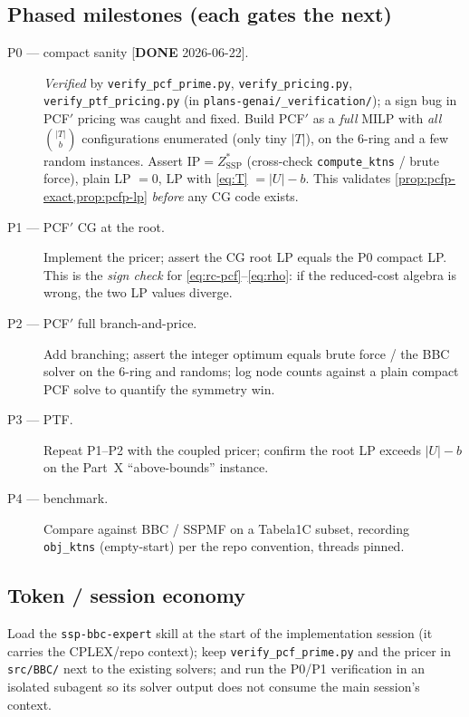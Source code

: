 \documentclass[11pt,a4paper]{article}
\theoremstyle{plain}
\theoremstyle{definition}
\newcommand{\ZSSP}{Z_{\mathrm{SSP}}^{*}}
\begin{document}
\subsection{Phased milestones (each gates the next)}
\begin{description}
\item[P0 --- compact sanity \textnormal{[\textbf{DONE} 2026-06-22]}.] \emph{Verified} by
      \texttt{verify\_pcf\_prime.py}, \texttt{verify\_pricing.py}, \texttt{verify\_ptf\_pricing.py}
      (in \texttt{plans-genai/\_verification/}); a sign bug in PCF$'$ pricing was caught and fixed.
      Build PCF$'$ as a \emph{full}
      MILP with \emph{all} $\binom{|T|}{b}$ configurations enumerated (only tiny $|T|$), on the
      $6$-ring and a few random instances. Assert $\mathrm{IP}=\ZSSP$ (cross-check
      \texttt{compute\_ktns} / brute force), plain LP $=0$, LP with \eqref{eq:T} $=|U|-b$. This
      validates \cref{prop:pcfp-exact,prop:pcfp-lp} \emph{before} any CG code exists.
\item[P1 --- PCF$'$ CG at the root.] Implement the pricer; assert the CG root LP equals the P0
      compact LP. This is the \emph{sign check} for \eqref{eq:rc-pcf}--\eqref{eq:rho}: if the
      reduced-cost algebra is wrong, the two LP values diverge.
\item[P2 --- PCF$'$ full branch-and-price.] Add branching; assert the integer optimum equals
      brute force / the BBC solver on the $6$-ring and randoms; log node counts against a plain
      compact PCF solve to quantify the symmetry win.
\item[P3 --- PTF.] Repeat P1--P2 with the coupled pricer; confirm the root LP exceeds $|U|-b$ on
      the Part~X ``above-bounds'' instance.
\item[P4 --- benchmark.] Compare against BBC / SSPMF on a Tabela1C subset, recording
      \texttt{obj\_ktns} (empty-start) per the repo convention, threads pinned.
\end{description}

\subsection{Token / session economy}
Load the \texttt{ssp-bbc-expert} skill at the start of the implementation session (it carries the
CPLEX/repo context); keep \texttt{verify\_pcf\_prime.py} and the pricer in
\texttt{src/BBC/} next to the existing solvers; and run the P0/P1 verification in an isolated
subagent so its solver output does not consume the main session's context.
\end{document}
